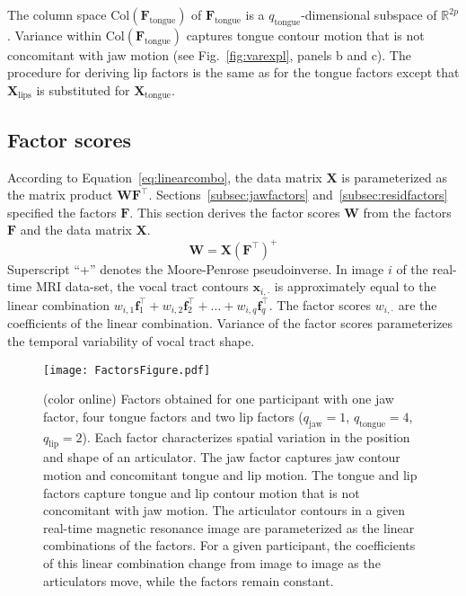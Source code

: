 \documentclass[preprint]{JASAnew}\usepackage[]{graphicx}\usepackage[]{color}
\begin{document}
The column space $\mathrm{Col}(\mathbf{F}_\text{tongue})$ of $\mathbf{F}_\text{tongue}$ is a $q_\text{tongue}$-dimensional subspace of $\mathbb{R}^{2p}$. 
%
Variance within $\mathrm{Col}(\mathbf{F}_\text{tongue})$ captures tongue contour motion that is not concomitant with jaw motion (see Fig.~\ref{fig:varexpl}, panels b and c). 
%
The procedure for deriving lip factors is the same as for the tongue factors except that $\mathbf{X}_\text{lips}$ is substituted for $\mathbf{X}_\text{tongue}$.




\subsection{Factor scores}
\label{subsec:weights}

According to Equation~\ref{eq:linearcombo}, the data matrix $\mathbf{X}$ is parameterized as the matrix product $\mathbf{W}\mathbf{F}^\intercal$. 
%
Sections~\ref{subsec:jawfactors} and~\ref{subsec:residfactors} specified the factors $\mathbf{F}$. 
%
This section derives the factor scores $\mathbf{W}$ from the factors $\mathbf{F}$ and the data matrix $\mathbf{X}$. 
%
\begin{equation}
\mathbf{W} 
 = \mathbf{X} \left( \mathbf{F}^\intercal \right) ^+
\end{equation}
%
Superscript ``+'' denotes the Moore-Penrose pseudoinverse.
%
In image $i$ of the real-time MRI data-set, the vocal tract contours $\mathbf{x}_{i,\cdot}$ is approximately equal to the linear combination $w_{i,1} \mathbf{f}_1^\intercal + w_{i,2} \mathbf{f}_2^\intercal + \ldots + w_{i,q} \mathbf{f}_q^\intercal$. The factor scores $w_{i,\cdot }$ are the coefficients of the linear combination. Variance of the factor scores parameterizes the temporal variability of vocal tract shape. 

\begin{figure}

\texttt{[image: FactorsFigure.pdf]}

\caption{(color online) Factors obtained for one participant with one jaw factor, four tongue factors and two lip factors ($q_\text{jaw} = 1$, $q_\text{tongue} = 4$, $q_\text{lip} = 2$). 
Each factor characterizes spatial variation in the position and shape of an articulator. 
The jaw factor captures jaw contour motion and concomitant tongue and lip motion.
The tongue and lip factors capture tongue and lip contour motion that is not concomitant with jaw motion. 
The articulator contours in a given real-time magnetic resonance image are parameterized as the linear combinations of the factors. 
For a given participant, the coefficients of this linear combination change from image to image as the articulators move, while the factors remain constant.}
\label{fig:gfa}
\end{figure}
\end{document}
